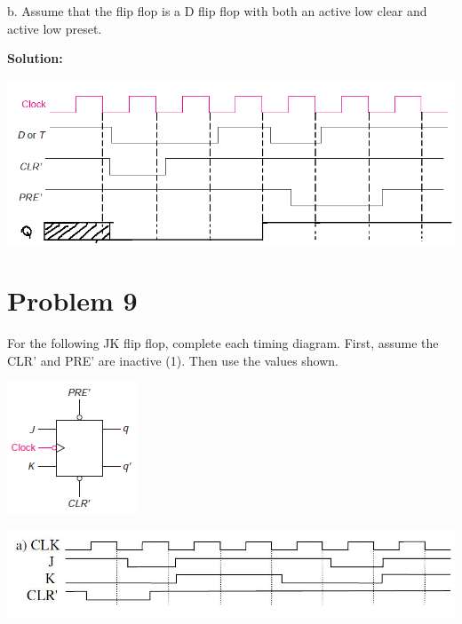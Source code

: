 \documentclass{article}
\begin{document}
    b. Assume that the flip flop is a D flip flop with both an active low clear and active 
    low preset.

    \textbf{Solution:}

    \begin{center}
        \includegraphics[width=\linewidth]{HW4_q8.2.png}
    \end{center}


    \section*{Problem 9}

    For the following JK flip flop, complete each timing diagram. First, assume the CLR’ 
    and PRE’ are inactive (1). Then use the values shown.

    \begin{center}
        \includegraphics[scale=0.75]{HW4_q9.1.png}
    \end{center}

    \begin{center}
        \includegraphics[width=\linewidth]{HW4_q9.2.png}
    \end{center}
\end{document}
